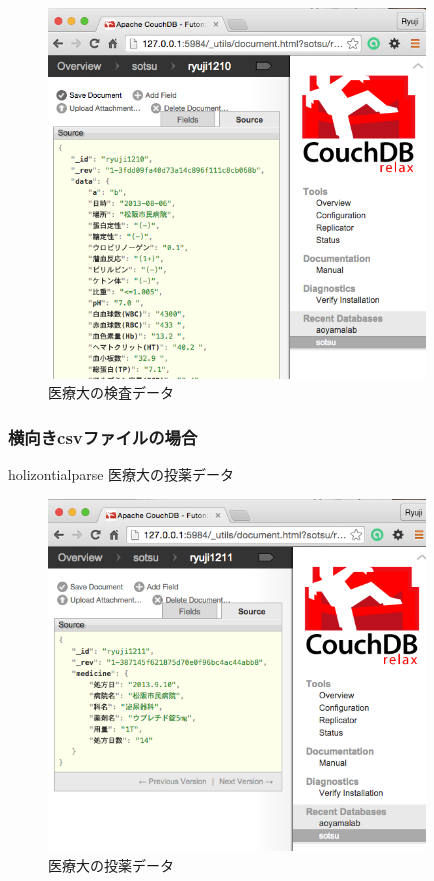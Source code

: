 			\begin{figure}[htbp]
				\begin{center}
					\includegraphics[width=10cm, bb=0 0 581 571, clip]{./gazou/kensa-data.png}
				\end{center}
				\caption{医療大の検査データ}
				\label{iryoudai-kensa-data}
			\end{figure}

		\subsubsection{横向きcsvファイルの場合}
			holizontialparse
			医療大の投薬データ
		\fi


			\begin{figure}[htbp]
				\begin{center}
					\includegraphics[width=10cm, bb=0 0 576 573]{./gazou/touyaku-data.png}
				\end{center}
				\caption{医療大の投薬データ}
				\label{iryoudai-touyaku-data}
			\end{figure}

